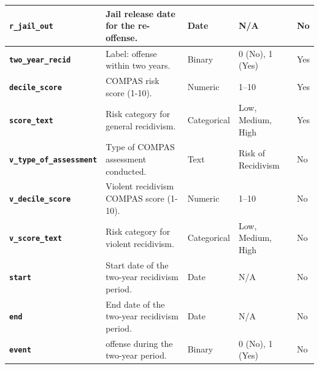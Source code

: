 \documentclass[conference]{IEEEtran}
\begin{document}
\begin{table}[!ht]
\begin{tabular}{|l|l|l|l|l|}
		\textbf{\texttt{r\_jail\_out}}	&	Jail release date for the re-offense.	&	Date	&	N/A	&	No \\ \hline
		\textbf{\texttt{two\_year\_recid}}	&	Label: offense within two years.	&	Binary	&	0 (No), 1 (Yes)	&	Yes \\ \hline
		\textbf{\texttt{decile\_score}}	&	COMPAS risk score (1-10).	&	Numeric	&	1–10	&	Yes \\ \hline
		\textbf{\texttt{score\_text}}	&	Risk category for general recidivism.	&	Categorical	&	Low, Medium, High	&	Yes \\ \hline
		\textbf{\texttt{v\_type\_of\_assessment}}	&	Type of COMPAS assessment conducted.	&	Text	&	Risk of Recidivism	&	No \\ \hline
		\textbf{\texttt{v\_decile\_score}}	&	Violent recidivism COMPAS score (1-10).	&	Numeric	&	1–10	&	No \\ \hline
		\textbf{\texttt{v\_score\_text}}	&	Risk category for violent recidivism.	&	Categorical	&	Low, Medium, High	&	No \\ \hline
		\textbf{\texttt{start}}	&	Start date of the two-year recidivism period.	&	Date	&	N/A	&	No \\ \hline
		\textbf{\texttt{end}}	&	End date of the two-year recidivism period.	&	Date	&	N/A	&	No \\ \hline
		\textbf{\texttt{event}}	&	offense during the two-year period.	&	Binary	&	0 (No), 1 (Yes)	&	No \\ \hline
	\end{tabular}
\end{table}
\end{document}
